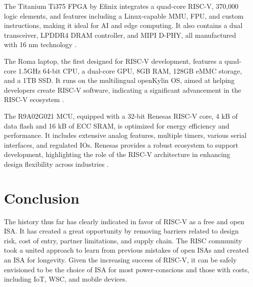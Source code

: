 \documentclass[journal]{IEEEtran}
\begin{document}
The Titanium Ti375 FPGA by Efinix integrates a quad-core RISC-V, 370,000 logic elements, and features including a Linux-capable MMU, FPU, and custom instructions, making it ideal for AI and edge computing. It also contains a dual transceiver, LPDDR4 DRAM controller, and MIPI D-PHY, all manufactured with 16 nm technology \cite{nordyk_fpga_2024}.

The Roma laptop, the first designed for RISC-V development, features a quad-core 1.5GHz 64-bit CPU, a dual-core GPU, 8GB RAM, 128GB eMMC storage, and a 1TB SSD. It runs on the multilingual openKylin OS, aimed at helping developers create RISC-V software, indicating a significant advancement in the RISC-V ecosystem \cite{ouz_worlds_nodate}.

The R9A02G021 MCU, equipped with a 32-bit Renesas RISC-V core, 4 kB of data flash and 16 kB of ECC SRAM, is optimized for energy efficiency and performance. It includes extensive analog features, multiple timers, various serial interfaces, and regulated IOs. Renesas provides a robust ecosystem to support development, highlighting the role of the RISC-V architecture in enhancing design flexibility across industries \cite{noauthor_ultra-low_nodate}.

\section{Conclusion}
The history thus far has clearly indicated in favor of RISC-V as a free and open ISA. It has created a great opportunity by removing barriers related to design risk, cost of entry, partner limitations, and supply chain. The RISC community took a united approach to learn from previous mistakes of open ISAs and created an ISA for longevity. Given the increasing success of RISC-V, it can be safely envisioned to be the choice of ISA for most power-conscious and those with costs, including IoT, WSC, and mobile devices.  












\end{document}
